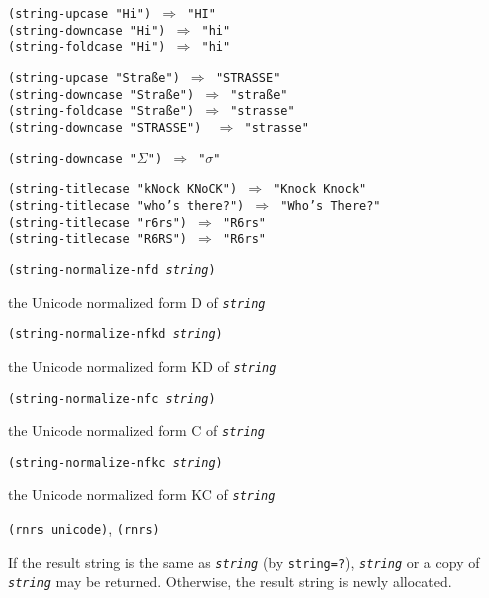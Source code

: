\begin{alltt}
(string-upcase "Hi") \(\Rightarrow\) "HI"
(string-downcase "Hi") \(\Rightarrow\) "hi"
(string-foldcase "Hi") \(\Rightarrow\) "hi"

(string-upcase "Straße") \(\Rightarrow\) "STRASSE"
(string-downcase "Straße") \(\Rightarrow\) "straße"
(string-foldcase "Straße") \(\Rightarrow\) "strasse"
(string-downcase "STRASSE")  \(\Rightarrow\) "strasse"

(string-downcase "\(\Sigma\)") \(\Rightarrow\) "\(\sigma\)"

(string-titlecase "kNock KNoCK") \(\Rightarrow\) "Knock Knock"
(string-titlecase "who's there?") \(\Rightarrow\) "Who's There?"
(string-titlecase "r6rs") \(\Rightarrow\) "R6rs"
(string-titlecase "R6RS") \(\Rightarrow\) "R6rs"
\end{alltt}

\begin{description}

\label{objects_s227}\item[procedure] \texttt{(string-normalize-nfd \textit{string})}



\item[returns] the Unicode normalized form D of \texttt{\textit{string}}


\item[procedure] \texttt{(string-normalize-nfkd \textit{string})}



\item[returns] the Unicode normalized form KD of \texttt{\textit{string}}


\item[procedure] \texttt{(string-normalize-nfc \textit{string})}



\item[returns] the Unicode normalized form C of \texttt{\textit{string}}


\item[procedure] \texttt{(string-normalize-nfkc \textit{string})}



\item[returns] the Unicode normalized form KC of \texttt{\textit{string}}


\item[libraries] \texttt{(rnrs unicode)}, \texttt{(rnrs)}
\end{description}


If the result string is the same as \texttt{\textit{string}} (by \texttt{string=?}),
\texttt{\textit{string}} or a copy of \texttt{\textit{string}} may be returned.
Otherwise, the result string is newly allocated.


